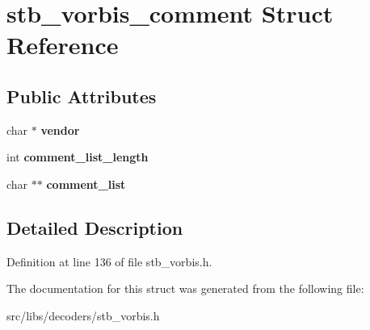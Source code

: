 \hypertarget{structstb__vorbis__comment}{\section{stb\-\_\-vorbis\-\_\-comment Struct Reference}
\label{structstb__vorbis__comment}
}
\subsection*{Public Attributes}
\begin{DoxyCompactItemize}
\item 
\hypertarget{structstb__vorbis__comment_a2d39c24fbb2ff48034f2c7b0be2b3a0e}{char $\ast$ {\bfseries vendor}}\label{structstb__vorbis__comment_a2d39c24fbb2ff48034f2c7b0be2b3a0e}

\item 
\hypertarget{structstb__vorbis__comment_ab31b9294952f0f0e61469d07ab4057f0}{int {\bfseries comment\-\_\-list\-\_\-length}}\label{structstb__vorbis__comment_ab31b9294952f0f0e61469d07ab4057f0}

\item 
\hypertarget{structstb__vorbis__comment_ad1b41ced43bc70618a588a7a4bbca67e}{char $\ast$$\ast$ {\bfseries comment\-\_\-list}}\label{structstb__vorbis__comment_ad1b41ced43bc70618a588a7a4bbca67e}

\end{DoxyCompactItemize}


\subsection{Detailed Description}


Definition at line 136 of file stb\-\_\-vorbis.\-h.



The documentation for this struct was generated from the following file\-:\begin{DoxyCompactItemize}
\item 
src/libs/decoders/stb\-\_\-vorbis.\-h\end{DoxyCompactItemize}
